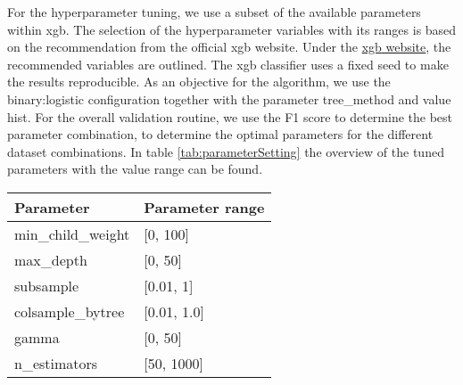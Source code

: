 \documentclass[
]{ceurart}
\begin{document}
For the hyperparameter tuning, we use a subset of the available parameters within \gls*{xgb}. The selection of the hyperparameter variables with its ranges is based on the recommendation from the official \gls*{xgb} website. Under the \href{https://xgboost.readthedocs.io/en/stable/tutorials/param_tuning.html}{\gls*{xgb} website}, the recommended variables are outlined. The \gls*{xgb} classifier uses a fixed seed to make the results reproducible. As an objective for the algorithm, we use the binary:logistic configuration together with the parameter tree\_method and value hist. For the overall validation routine, we use the F1 score to determine the best parameter combination, to determine the optimal parameters for the different dataset combinations. In table \ref{tab:parameterSetting} the overview of the tuned parameters with the value range can be found.

\begin{table*}[ht]
	\caption{Hyperparameter selection together with parameter range}
	\label{tab:parameterSetting}
	\begin{tabular}{p{}p{}}
		\toprule
		Parameter          & Parameter range \\
		\midrule
		min\_child\_weight & [0, 100]        \\
		max\_depth         & [0, 50]         \\
		subsample          & [0.01, 1]       \\
		colsample\_bytree  & [0.01, 1.0]     \\
		gamma              & [0, 50]         \\
		n\_estimators      & [50, 1000]      \\
		\bottomrule
	\end{tabular}
\end{table*}
\end{document}
